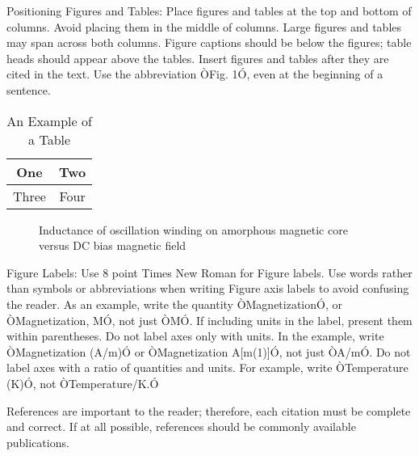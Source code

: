 \documentclass[a4paper, 10pt, conference]{ieeeconf}      %
\begin{document}
Positioning Figures and Tables: Place figures and tables at the top and bottom of columns. Avoid placing them in the middle of columns. Large figures and tables may span across both columns. Figure captions should be below the figures; table heads should appear above the tables. Insert figures and tables after they are cited in the text. Use the abbreviation ÒFig. 1Ó, even at the beginning of a sentence.

\begin{table}[h]
	\caption{An Example of a Table}
	\label{table_example}
	\begin{center}
		\begin{tabular}{|c||c|}
			\hline
			One & Two\\
			\hline
			Three & Four\\
			\hline
		\end{tabular}
	\end{center}
\end{table}


\begin{figure}[thpb]
	\centering
	\caption{Inductance of oscillation winding on amorphous
		magnetic core versus DC bias magnetic field}
	\label{figurelabel}
\end{figure}


Figure Labels: Use 8 point Times New Roman for Figure labels. Use words rather than symbols or abbreviations when writing Figure axis labels to avoid confusing the reader. As an example, write the quantity ÒMagnetizationÓ, or ÒMagnetization, MÓ, not just ÒMÓ. If including units in the label, present them within parentheses. Do not label axes only with units. In the example, write ÒMagnetization (A/m)Ó or ÒMagnetization {A[m(1)]}Ó, not just ÒA/mÓ. Do not label axes with a ratio of quantities and units. For example, write ÒTemperature (K)Ó, not ÒTemperature/K.Ó




References are important to the reader; therefore, each citation must be complete and correct. If at all possible, references should be commonly available publications.
\end{document}
